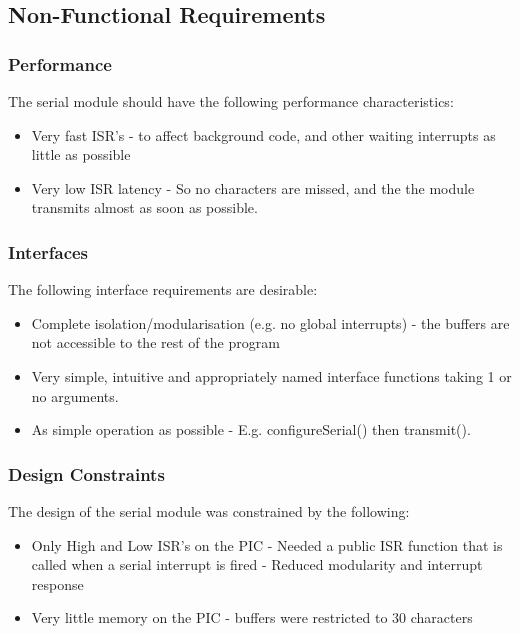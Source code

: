 \documentclass[]{report}
\begin{document}
\subsection{Non-Functional Requirements}
\subsubsection{Performance}
The serial module should have the following performance characteristics:
\begin{itemize}
	\item Very fast ISR's - to affect background code, and other waiting interrupts as little as possible
	\item Very low ISR latency - So no characters are missed, and the the module transmits almost as soon as possible.
\end{itemize}

\subsubsection{Interfaces}
The following interface requirements are desirable:
\begin{itemize}
	\item Complete isolation/modularisation (e.g. no global interrupts) - the buffers are not accessible to the rest of the program
	\item Very simple, intuitive and appropriately named interface functions taking 1 or no arguments.
	\item As simple operation as possible - E.g. configureSerial() then transmit().
\end{itemize}

\subsubsection{Design Constraints}
The design of the serial module was constrained by the following:
\begin{itemize}
	\item Only High and Low ISR's on the PIC - Needed a public ISR function that is called when a serial interrupt is fired - Reduced modularity and interrupt response
	\item Very little memory on the PIC - buffers were restricted to 30 characters
\end{itemize}
\end{document}
